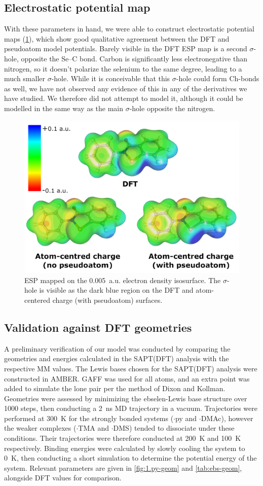 \begin{refsection}
\subsection{Electrostatic potential map}
With these parameters in hand, we were able to construct electrostatic potential maps (\cref{fig:ebs-esp}), which show good qualitative agreement between the DFT and pseudoatom model potentials.
Barely visible in the DFT ESP map is a second $\sigma$-hole, opposite the Se--C bond.
Carbon is significantly less electronegative than nitrogen, so it doesn't polarize the selenium to the same degree, leading to a much smaller $\sigma$-hole.
While it is conceivable that this $\sigma$-hole could form Ch-bonds as well, we have not observed any evidence of this in any of the derivatives we have studied.\autocite{Fellowes2019}
We therefore did not attempt to model it, although it could be modelled in the same way as the main $\sigma$-hole opposite the nitrogen.

\begin{figure}
    \centering
    \includegraphics[width=0.5\linewidth]{Figures/mm-dft-esp.pdf}
    \caption{ESP mapped on the 0.005~a.u. electron density isosurface. The $\sigma$-hole is visible as the dark blue region on the DFT and atom-centered charge (with pseudoatom) surfaces.}
    \label{fig:ebs-esp}
\end{figure}

\subsection{Validation against DFT geometries}
A preliminary verification of our model was conducted by comparing the geometries and energies calculated in the SAPT(DFT) analysis with the respective MM values.
The Lewis bases chosen for the SAPT(DFT) analysis were constructed in AMBER.
GAFF was used for all atoms, and an extra point was added to simulate the lone pair per the method of Dixon and Kollman.\autocite{Dixon1997}
Geometries were assessed by minimizing the ebselen-Lewis base structure over 1000 steps, then conducting a 2~ns MD trajectory in a vacuum.
Trajectories were performed at 300~K for the strongly bonded systems ($\cdot$py and $\cdot$DMAc), however the weaker complexes ($\cdot$TMA and $\cdot$DMS) tended to dissociate under these conditions.
Their trajectories were therefore conducted at 200~K and 100~K respectively.
Binding energies were calculated by slowly cooling the system to 0~K, then conducting a short simulation to determine the potential energy of the system.
Relevant parameters are given in \cref{fig:1.py-geom} and \cref{tab:ebs-geom}, alongside DFT values for comparison.


\end{refsection}
